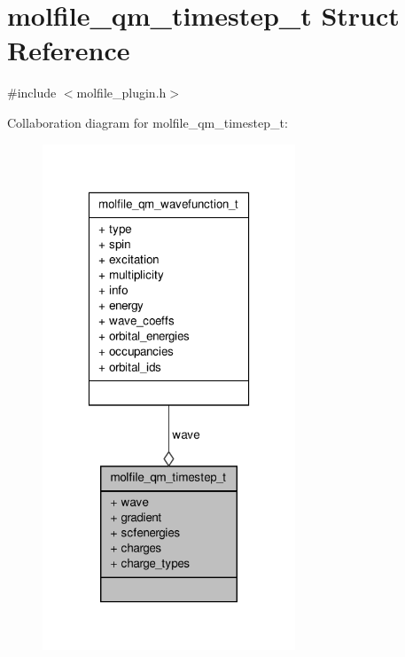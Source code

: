 \hypertarget{structmolfile__qm__timestep__t}{\section{molfile\-\_\-qm\-\_\-timestep\-\_\-t \-Struct \-Reference}
\label{structmolfile__qm__timestep__t}
}


{\ttfamily \#include $<$molfile\-\_\-plugin.\-h$>$}



\-Collaboration diagram for molfile\-\_\-qm\-\_\-timestep\-\_\-t\-:
\nopagebreak
\begin{figure}[H]
\begin{center}
\leavevmode
\includegraphics[width=214pt]{structmolfile__qm__timestep__t__coll__graph}
\end{center}
\end{figure}
